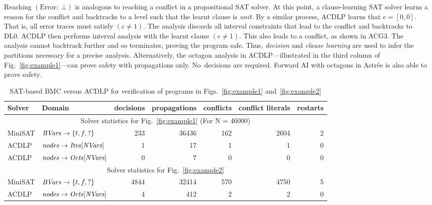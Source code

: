 Reaching $(\mathrm{Error}{:}\;\bot)$ is analogous to reaching a conflict in
a propositional SAT solver.  At this point, a clause-learning SAT solver
learns a reason for the conflict and backtracks to a level such that the
learnt clause is \textit{unit}.  By a similar process, ACDLP learns that
$c=[0,0]$.  That is, all error traces must satisfy $(c \neq 1)$.  The
analysis discards all interval constraints that lead to the conflict and
backtracks to DL0.  ACDLP then performs interval analysis with the learnt
clause $(c \neq 1)$.  This also leads to a conflict, as shown in ACG3.  The
analysis cannot backtrack further and so terminates, proving the program
safe.  Thus, {\em decision} and {\em clause learning} are used to infer the
partitions necessary for a precise analysis.  Alternatively, the octagon
analysis in ACDLP---illustrated in the third column of
Fig.~\ref{fig:example1}---can prove safety with propagations only. 
No~decisions are required.  Forward AI with octagons in Astr{\'e}e is also
able to prove safety.  
%
\begin{table}[!b]
\begin{center}
{
\begin{tabular}{l|l|r|r|r|r|r}
\hline
  Solver & Domain & decisions & propagations & conflicts & conflict literals & restarts \\ \hline
  \multicolumn{7}{c}{Solver statistics for Fig.~\ref{fig:example1} (For N = 46000)} \\ \hline
  MiniSAT & $\mathit{BVars} \rightarrow \{t,f,?\} $ & 233 & 36436 & 162 & 2604 & 2 \\ \hline
  ACDLP & $\mathit{nodes} \rightarrow \mathit{Itvs}[\mathit{NVars}]$ & 1 & 17 & 1 & 1 & 0 \\ \hline
  ACDLP & $\mathit{nodes} \rightarrow \mathit{Octs}[\mathit{NVars}]$ & 0 & 7 & 0 & 0 & 0 \\ \hline 
  \multicolumn{7}{c}{Solver statistics for Fig.~\ref{fig:example2}} \\ \hline
  MiniSAT & $\mathit{BVars} \rightarrow \{t,f,?\} $ & 4844 & 32414 & 570 & 4750 & 5 \\ \hline
  ACDLP & $\mathit{nodes} \rightarrow \mathit{Octs}[\mathit{NVars}]$ & 4 & 412 & 2 & 2 & 0 \\ 
\hline
\end{tabular}
}
\end{center}
\caption{SAT-based BMC versus ACDLP for verification of programs in Figs.~\ref{fig:example1} and~\ref{fig:example2}}
\label{solver}
\end{table}
%
%
